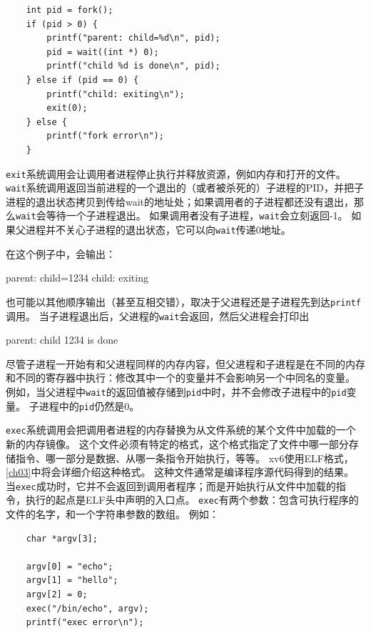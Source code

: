 \begin{lstlisting}
    int pid = fork();
    if (pid > 0) {
        printf("parent: child=%d\n", pid);
        pid = wait((int *) 0);
        printf("child %d is done\n", pid);
    } else if (pid == 0) {
        printf("child: exiting\n");
        exit(0);
    } else {
        printf("fork error\n");
    }
\end{lstlisting}

\texttt{exit}系统调用会让调用者进程停止执行并释放资源，例如内存和打开的文件。
\texttt{wait}系统调用返回当前进程的一个退出的（或者被杀死的）子进程的PID，并把子进程的退出状态拷贝到传给wait的地址处；如果调用者的子进程都还没有退出，那么\texttt{wait}会等待一个子进程退出。
如果调用者没有子进程，\texttt{wait}会立刻返回-1。
如果父进程并不关心子进程的退出状态，它可以向\texttt{wait}传递0地址。

在这个例子中，会输出：
\begin{blacklisting}
    parent: child=1234
    child: exiting
\end{blacklisting}    

也可能以其他顺序输出（甚至互相交错），取决于父进程还是子进程先到达\texttt{printf}调用。
当子进程退出后，父进程的\texttt{wait}会返回，然后父进程会打印出
\begin{blacklisting}
    parent: child 1234 is done
\end{blacklisting}

尽管子进程一开始有和父进程同样的内存内容，但父进程和子进程是在不同的内存和不同的寄存器中执行：修改其中一个的变量并不会影响另一个中同名的变量。
例如，当父进程中\texttt{wait}的返回值被存储到\texttt{pid}中时，并不会修改子进程中的\texttt{pid}变量。
子进程中的\texttt{pid}仍然是0。

\texttt{exec}系统调用会把调用者进程的内存替换为从文件系统的某个文件中加载的一个新的内存镜像。
这个文件必须有特定的格式，这个格式指定了文件中哪一部分存储指令、哪一部分是数据、从哪一条指令开始执行，等等。
xv6使用ELF格式，\autoref{ch03}中将会详细介绍这种格式。
这种文件通常是编译程序源代码得到的结果。
当\texttt{exec}成功时，它并不会返回到调用者程序；而是开始执行从文件中加载的指令，执行的起点是ELF头中声明的入口点。
\texttt{exec}有两个参数：包含可执行程序的文件的名字，和一个字符串参数的数组。
例如：
\begin{lstlisting}
    char *argv[3];

    argv[0] = "echo";
    argv[1] = "hello";
    argv[2] = 0;
    exec("/bin/echo", argv);
    printf("exec error\n");
\end{lstlisting}


